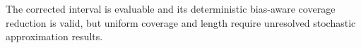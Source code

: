 The corrected interval is evaluable and its deterministic bias-aware coverage reduction is valid, but uniform coverage and length require unresolved stochastic approximation results.